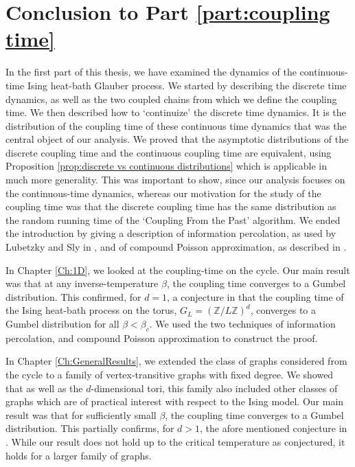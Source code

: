 \chapter{Conclusion to Part \ref{part:coupling time}}
\label{Ch:CouplingConclusion}


In the first part of this thesis, we have examined the dynamics of the continuous-time Ising heat-bath Glauber process. We started by describing the discrete time dynamics, as well as the two coupled chains from which we define the coupling time. We then described how to `continuize' the discrete time dynamics. It is the distribution of the coupling time of these continuous time dynamics that was the central object of our analysis. We proved that the asymptotic distributions of the discrete coupling time and the continuous coupling time are equivalent, using Proposition \ref{prop:discrete vs continuous distributions} which is applicable in much more generality. This was important to show, since our analysis focuses on the continuous-time dynamics, whereas our motivation for the study of the coupling time was that the discrete coupling time has the same distribution as the random running time of the `Coupling From the Past' algorithm. We ended the introduction by giving a description of information percolation, as used by Lubetzky and Sly in \cite{Lubetzky2016-wd}, and of compound Poisson approximation, as described in \cite{Barbour2001-nh}.

In Chapter \ref{Ch:1D}, we looked at the coupling-time on the cycle. Our main result was that at any inverse-temperature $\beta$, the coupling time converges to a Gumbel distribution. This confirmed, for $d = 1$, a conjecture in \cite[Conjecture 7.1]{Collevecchio2018-nq} that the coupling time of the Ising heat-bath process on the torus, $G_L = (\mathbb{Z} / L \mathbb{Z})^d$, converges to a Gumbel distribution for all $\beta < \beta_c$. We used the two techniques of information percolation, and compound Poisson approximation to construct the proof.

In Chapter \ref{Ch:GeneralResults}, we extended the class of graphs considered from the cycle to a family of vertex-transitive graphs with fixed degree. We showed that as well as the $d$-dimensional tori, this family also included other classes of graphs which are of practical interest with respect to the Ising model. Our main result was that for sufficiently small $\beta$, the coupling time converges to a Gumbel distribution. This partially confirms, for $d > 1$, the afore mentioned conjecture in \cite{Collevecchio2018-nq}. While our result does not hold up to the critical temperature as conjectured, it holds for a larger family of graphs.

